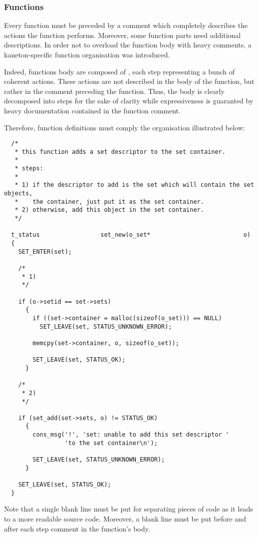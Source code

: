 \subsubsection{Functions}

Every function must be preceded by a comment which completely describes the
actions the function performs. Moreover, some function parts need additional
descriptions. In order not to overload the function body with heavy comments,
a kaneton-specific function organisation was introduced.

Indeed, functions body are composed of , each step representing
a bunch of coherent actions. These actions are not described in the body
of the function, but rather in the comment preceding the function. Thus,
the body is clearly decomposed into steps for the sake of clarity
while expressiveness is guaranted by heavy documentation contained in the
function comment.

Therefore, function definitions must comply the organisation illustrated
below:

\begin{verbatim}
  /*
   * this function adds a set descriptor to the set container.
   *
   * steps:
   *
   * 1) if the descriptor to add is the set which will contain the set objects,
   *    the container, just put it as the set container.
   * 2) otherwise, add this object in the set container.
   */

  t_status                 set_new(o_set*                          o)
  {
    SET_ENTER(set);

    /*
     * 1)
     */

    if (o->setid == set->sets)
      {
        if ((set->container = malloc(sizeof(o_set))) == NULL)
          SET_LEAVE(set, STATUS_UNKNOWN_ERROR);

        memcpy(set->container, o, sizeof(o_set));

        SET_LEAVE(set, STATUS_OK);
      }

    /*
     * 2)
     */

    if (set_add(set->sets, o) != STATUS_OK)
      {
        cons_msg('!', 'set: unable to add this set descriptor '
                 'to the set container\n');

        SET_LEAVE(set, STATUS_UNKNOWN_ERROR);
      }

    SET_LEAVE(set, STATUS_OK);
  }
\end{verbatim}

Note that a single blank line must be put for separating pieces of code
as it leads to a more readable source code. Moreover, a blank line must
be put before and after each step comment in the function's body.


